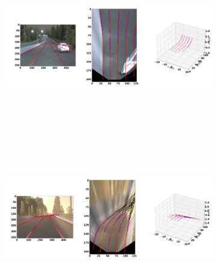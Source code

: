         \begin{figure}[h]
      \caption{Qualitative results of the trained GenLaneNet\cite{guo2020gen} trained with complex binary lane segmentation architecture on balanced scenes from sim3D\cite{guo2020gen} dataset: (a) uphill (b) downhill scenario. The ground-truth lines are color coded in red and the predicted lanes in blue. }
        \centering
        \begin{subfigure}{1\textwidth}
        \includegraphics[width=1\linewidth, height=7cm]{images/uphill_standard.png} 
        \caption{  }
        \label{fig:subim1}
        \end{subfigure}
        \begin{subfigure}{1\textwidth}
        \includegraphics[width=1\linewidth,height=7cm]{images/downhill_standard.png}
        \caption{}
        \label{fig:subim2}
        \end{subfigure}
        \end{figure}


